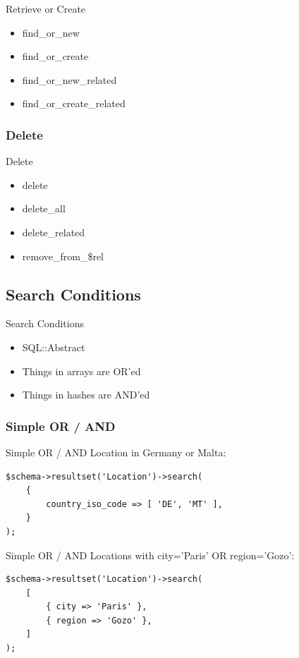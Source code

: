 \begin{frame}{Retrieve or Create}
\begin{itemize}
\item find\_or\_new
\item find\_or\_create
\item find\_or\_new\_related 
\item find\_or\_create\_related
\end{itemize}
\end{frame}

\subsubsection{Delete}

\begin{frame}{Delete}
\begin{itemize}
\item delete
\item delete\_all
\item delete\_related
\item remove\_from\_\$rel
\end{itemize}
\end{frame}

\subsection{Search Conditions}

\begin{frame}{Search Conditions}
\begin{itemize}
\item SQL::Abstract
\item Things in arrays are OR'ed
\item Things in hashes are AND'ed
\end{itemize}
\end{frame}

\subsubsection{Simple OR / AND}
\begin{frame}[fragile]{Simple OR / AND}
Location in Germany or Malta:
\begin{lstlisting}
$schema->resultset('Location')->search(
    {
        country_iso_code => [ 'DE', 'MT' ],
    }
);
\end{lstlisting}
\end{frame}

\begin{frame}[fragile]{Simple OR / AND}
Locations with city='Paris' OR region='Gozo':

\begin{lstlisting}
$schema->resultset('Location')->search(
    [
        { city => 'Paris' },
        { region => 'Gozo' },
    ]
);
\end{lstlisting}
\end{frame}

